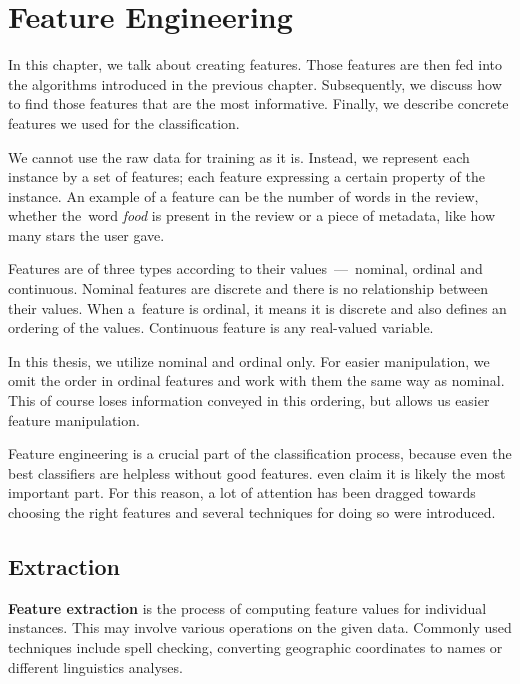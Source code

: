 \chapter{Feature Engineering} \label{chap:fea}

In this chapter, we talk about creating features.
Those features are then fed into the algorithms
introduced in the previous chapter.
Subsequently, we discuss how to find those features that are the most informative.
Finally, we describe concrete features we used for the classification.

We cannot use the raw data for training as it is.
Instead, we represent each instance by a set of features;
each feature expressing a certain property of the instance.
An example of a feature can be the number of words in the review,
whether the~word {\it food} is present in the review
or a piece of metadata, like how many stars the user gave.

Features are of three types according to their values~---~nominal, ordinal and continuous.
Nominal features are discrete and there is no relationship between their values.
When a~feature is ordinal, it means it is discrete and also defines an ordering of the values.
Continuous feature is any real-valued variable.

In this thesis, we utilize nominal and ordinal only.
For easier manipulation,
we omit the order in ordinal features and work with them the same way as nominal.
This of course loses information conveyed in this ordering,
but allows us easier feature manipulation.

Feature engineering is a crucial part of the classification process,
because even the best classifiers are helpless without good features.
\citet{liu2012feature} even claim it is likely the most important part.
For this reason, a lot of attention has been dragged towards choosing the right features
and several techniques for doing so were introduced.



\section{Extraction}

\textbf{Feature extraction} is the process of computing feature values for individual instances.
This may involve various operations on the given data.
Commonly used techniques include spell checking, converting geographic coordinates to names
or different linguistics analyses.

